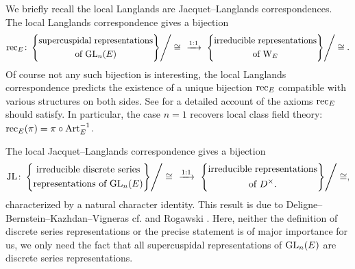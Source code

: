 \documentclass[../main.tex]{subfiles}
\begin{document}
We briefly recall the local Langlands are Jacquet--Langlands correspondences.
The local Langlands correspondence gives a bijection
\begin{equation*}
  \rec_E\colon \left\{
\begin{gathered}\text{supercuspidal representations} \\
\text{of $\GL_n(E)$}\end{gathered}\middle\}\right / \cong \ \ 
\xto{1:1} \  \left\{\begin{gathered}\text{irreducible representations} \\
\text{of $\Weil_E$} \end{gathered}\middle\}\right/\cong.
\end{equation*}
Of course not any such bijection is interesting, the local Langlands correspondence
predicts the existence of a unique bijection $\mathrm{rec}_E$ compatible with various
structures on both sides. See \cite[Section 12.4]{getz2023introduction} for a
detailed account of the axioms $\mathrm{rec}_E$ should satisfy.
In particular, the case $n=1$ recovers local class field theory: 
$\mathrm{rec}_E(\pi) = \pi \circ \mathrm{Art}_E^{-1}$. 

The local Jacquet--Langlands correspondence gives a bijection 
\begin{equation*}
  \JL\colon \left\{
\begin{gathered}\text{irreducible discrete series} \\
\text{representations of $\GL_n(E)$}\end{gathered}\middle\}\right / \cong \ \ 
\xto{1:1} \  \left\{\begin{gathered}\text{irreducible representations} \\
\text{of $D^\times$}. \end{gathered}\middle\}\right/\cong,
\end{equation*}
characterized by a natural character identity. This result is due to
Deligne--Bernstein--Kazhdan--Vigneras cf. \cite{deligne1984representations} and 
Rogawski \cite{rogawski1983representations}. Here, neither the definition of discrete
series representations or the precise statement is of major importance for us,
we only need the fact that all supercuspidal representations of $\operatorname{GL}_n(E)$ are
discrete series representations. 
\end{document}

